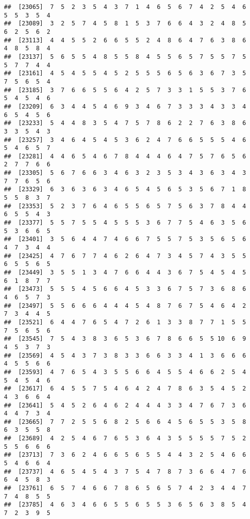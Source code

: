 \documentclass[
]{book}
\begin{document}
\begin{verbatim}
##  [23065]  7  5  2  3  5  4  3  7  1  4  6  5  6  7  4  2  5  4  6  5  5  3  5  4
##  [23089]  3  2  5  7  4  5  8  1  5  3  7  6  6  4  3  2  4  8  5  6  2  5  6  2
##  [23113]  4  4  5  5  2  6  6  5  5  2  4  8  6  4  7  6  3  8  6  4  8  5  8  4
##  [23137]  5  6  5  5  4  8  5  5  8  4  5  5  6  5  7  5  5  7  5  5  7  7  4  4
##  [23161]  4  5  4  5  5  4  5  2  5  5  5  6  5  6  3  6  7  3  5  7  5  6  5  4
##  [23185]  3  7  6  6  5  5  6  4  2  5  7  3  3  1  5  5  3  7  6  5  4  5  4  6
##  [23209]  6  3  4  4  5  4  6  9  3  4  6  7  3  3  3  4  3  3  4  6  5  4  5  6
##  [23233]  5  4  4  8  3  5  4  7  5  7  8  6  2  2  7  6  3  8  6  3  3  5  4  3
##  [23257]  3  4  6  4  5  4  5  3  6  2  4  7  6  6  5  5  5  4  6  5  4  6  5  7
##  [23281]  4  4  6  5  4  6  7  8  4  4  4  6  4  7  5  7  6  5  6  2  7  7  6  6
##  [23305]  5  6  7  6  6  3  4  6  3  2  3  5  3  4  3  6  3  4  3  7  7  6  5  6
##  [23329]  6  3  6  3  6  3  4  6  5  4  5  6  5  3  5  6  7  1  8  5  5  8  3  7
##  [23353]  5  2  3  7  6  4  6  5  5  6  5  7  5  6  3  7  8  4  4  6  5  5  4  3
##  [23377]  5  5  7  5  5  4  5  5  5  3  6  7  7  5  4  6  3  5  6  5  3  6  6  5
##  [23401]  3  5  6  4  4  7  4  6  6  7  5  5  7  5  3  5  6  5  6  4  7  3  4  4
##  [23425]  4  7  6  7  7  4  6  2  6  4  7  3  4  5  7  4  3  5  5  6  5  5  6  5
##  [23449]  3  5  5  1  3  4  7  6  6  4  4  3  6  7  5  4  5  4  5  6  1  8  7  7
##  [23473]  5  5  5  4  5  6  6  4  5  3  3  6  7  5  7  3  6  8  6  4  6  5  7  3
##  [23497]  5  5  6  6  6  4  4  4  5  4  8  7  6  7  5  4  6  4  2  7  3  4  4  5
##  [23521]  6  4  4  7  6  5  4  7  2  6  1  3  3  8  7  7  1  5  5  7  5  6  5  6
##  [23545]  7  5  4  3  8  3  6  5  3  6  7  8  6  6  5  5 10  6  9  4  5  3  7  3
##  [23569]  4  5  4  3  7  3  8  3  3  6  6  3  3  4  1  3  6  6  6  4  5  5  6  6
##  [23593]  4  7  6  5  4  3  5  5  6  6  4  5  5  4  6  6  2  5  4  5  4  5  4  6
##  [23617]  6  4  5  5  7  5  4  6  4  2  4  7  8  6  3  5  4  5  2  4  3  6  6  4
##  [23641]  5  4  5  2  6  4  6  2  4  4  4  3  3  4  7  6  7  3  6  4  4  7  3  4
##  [23665]  7  7  2  5  5  6  8  2  5  6  6  4  5  6  5  5  3  5  8  6  3  5  5  8
##  [23689]  4  2  5  4  6  7  6  5  3  6  4  3  5  5  5  5  7  5  2  5  5  6  6  6
##  [23713]  7  3  6  2  4  6  6  5  6  5  5  4  4  3  2  5  4  6  6  5  4  6  6  4
##  [23737]  4  6  5  4  5  4  3  7  5  4  7  8  7  3  6  6  4  7  6  6  4  5  8  3
##  [23761]  6  5  7  4  6  6  7  8  6  5  6  5  7  4  2  3  4  4  7  7  4  8  5  5
##  [23785]  4  6  3  4  6  6  5  5  6  5  5  3  6  5  6  3  8  5  4  7  2  3  9  5

\end{verbatim}
\end{document}
